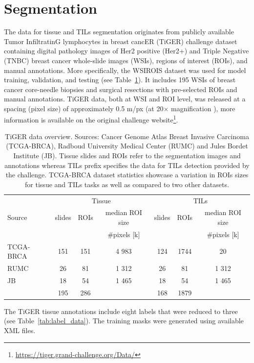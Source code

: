 \section{Segmentation} \label{section:data_segmentation}
The data for tissue and TILs segmentation originates from publicly available
Tumor InfiltratinG lymphocytes in breast cancER (TiGER) challenge dataset containing
digital pathology images of Her2 positive (Her2+) and Triple Negative (TNBC) breast
cancer whole-slide images (WSIs), regions of interest (ROIs), and manual annotations.
More specifically, the WSIROIS dataset was used for model training, validation, and
testing (see Table~\ref*{tab:segm_data}).
It includes 195 WSIs of breast cancer core-needle biopsies and surgical resections with
pre-selected ROIs and manual annotations.
TiGER data, both at WSI and ROI level, was released at a spacing (pixel size) of
approximately 0.5 \textmu m/px (at 20$\times$ magnification ), more information is available on the original
challenge website\footnote{\url{https://tiger.grand-challenge.org/Data/}}.
\begin{table}[h!]
\centering
\begin{tabular}{ l c c c c c c } 
\hline
\multirow{3}{*}{Source} &  \multicolumn{3}{c}{Tissue} & \multicolumn{3}{c}{TILs}\\ 
\cline{2-7}
 & slides & ROIs & median ROI size & slides & ROIs & median ROI size \\ 
  & & & \#pixels [k] & & & \#pixels [k] \\ 
\hline
TCGA-BRCA & 151 & 151 & 4 983 & 124 & 1744 & 20\\ 
RUMC & 26 & 81 & 1 312 & 26 & 81 & 1 312\\ 
JB & 18 & 54 & 1 465 & 18 & 54 & 1 465\\
\hline
 & 195 & 286 & & 168 & 1879 &\\
\end{tabular}
\caption{\label{tab:segm_data}TiGER data overview. Sources: Cancer Genome Atlas Breast Invasive Carcinoma (TCGA-BRCA),
Radboud University Medical Center (RUMC) and Jules Bordet Institute (JB). Tissue slides and ROIs refer to the segmentation
images and annotations whereas TILs prefix specifies the data for TILs detection provided by the challenge.
TCGA-BRCA dataset statistics showcase a variation in ROIs sizes for tissue and TILs tasks as well as compared to two other datasets.}
\end{table}
The TiGER tissue annotations include eight
labels that were reduced to three (see Table~\ref*{tab:label_data}).
The training masks were generated using available XML files.
